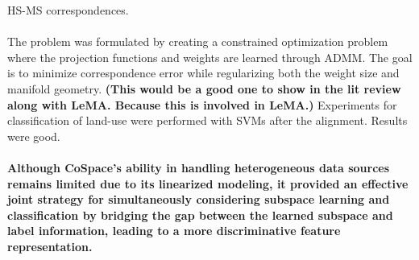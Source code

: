 \documentclass[]{article}
\begin{document}
HS-MS correspondences.
		\\ \\
		The problem was formulated by creating a constrained optimization problem where the projection functions and weights are learned through ADMM.  The goal is to minimize correspondence error while regularizing both the weight size and manifold geometry. \textbf{(This would be a good one to show in the lit review along with LeMA.  Because this is involved in LeMA.) }  Experiments for classification of land-use were performed with SVMs after the alignment.  Results were good.
		\\ \\
		\textbf{\large{Although CoSpace's ability in handling heterogeneous data sources remains limited due to its linearized modeling, it provided an effective joint strategy for simultaneously considering subspace learning and classification by bridging the gap between the learned subspace and label information, leading to a more discriminative  feature representation.}} \\
		
\end{document}
